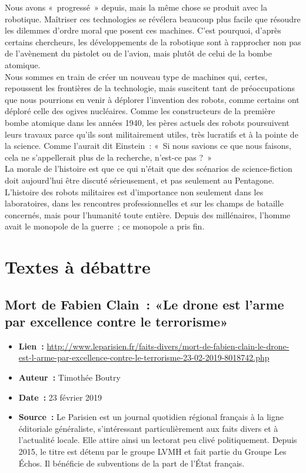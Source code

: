\documentclass[8pt]{article}
\begin{document}
Nous avons «~progressé~» depuis, mais la même chose se produit avec la robotique. Maîtriser ces technologies se révélera beaucoup plus facile que résoudre les dilemmes d’ordre moral que posent ces machines. C’est pourquoi, d’après certains chercheurs, les développements de la robotique sont à rapprocher non pas de l’avènement du pistolet ou de l’avion, mais plutôt de celui de la bombe atomique.\\

Nous sommes en train de créer un nouveau type de machines qui, certes, repoussent les frontières de la technologie, mais suscitent tant de préoccupations que nous pourrions en venir à déplorer l’invention des robots, comme certains ont déploré celle des ogives nucléaires. Comme les constructeurs de la première bombe atomique dans les années 1940, les pères actuels des robots poursuivent leurs travaux parce qu’ils sont militairement utiles, très lucratifs et à la pointe de la science. Comme l’aurait dit Einstein~: «~Si nous savions ce que nous faisons, cela ne s’appellerait plus de la recherche, n’est-ce pas ?~»\\

La morale de l’histoire est que ce qui n’était que des scénarios de science-fiction doit aujourd’hui être discuté sérieusement, et pas seulement au Pentagone. L’histoire des robots militaires est d’importance non seulement dans les laboratoires, dans les rencontres professionnelles et sur les champs de bataille concernés, mais pour l’humanité toute entière. Depuis des millénaires, l’homme avait le monopole de la guerre~; ce monopole a pris fin. 

\newpage

\section{Textes à débattre}
\subsection{Mort de Fabien Clain~: «Le drone est l’arme par excellence contre le terrorisme»}
\label{sec:Fabien_Clain}

\begin{itemize}
	\item \textbf{Lien~: }  \url{http://www.leparisien.fr/faits-divers/mort-de-fabien-clain-le-drone-est-l-arme-par-excellence-contre-le-terrorisme-23-02-2019-8018742.php} 
	\item \textbf{Auteur~: } Timothée Boutry
	\item \textbf{Date~: } 23 février 2019
	\item \textbf{Source~: } Le Parisien est un journal quotidien régional français à la ligne éditoriale généraliste, s'intéressant particulièrement aux faits divers et à l'actualité locale. Elle attire ainsi un lectorat peu clivé politiquement. Depuis 2015, le titre est détenu par le groupe LVMH et fait partie du Groupe Les Échos. Il bénéficie de subventions de la part de l'État français. 
\end{itemize}
\end{document}
